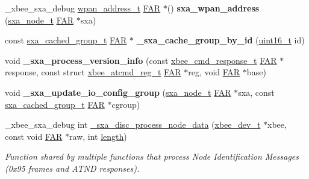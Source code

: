 \begin{DoxyCompactItemize}
\+\_\+xbee\+\_\+sxa\+\_\+debug \hyperlink{structwpan__address__t}{wpan\+\_\+address\+\_\+t} \hyperlink{group__hal_gaef060b3456fdcc093a7210a762d5f2ed}{F\+AR} $\ast$() {\bfseries sxa\+\_\+wpan\+\_\+address} (\hyperlink{structsxa__node__t}{sxa\+\_\+node\+\_\+t} \hyperlink{group__hal_gaef060b3456fdcc093a7210a762d5f2ed}{F\+AR} $\ast$sxa)
\item 
\mbox{\label{group___s_x_a_gaf299bcddfe8f4dfb4a3f0617a16d671e}} 
const \hyperlink{structsxa__cached__group__t}{sxa\+\_\+cached\+\_\+group\+\_\+t} \hyperlink{group__hal_gaef060b3456fdcc093a7210a762d5f2ed}{F\+AR} $\ast$ {\bfseries \+\_\+sxa\+\_\+cache\+\_\+group\+\_\+by\+\_\+id} (\hyperlink{group__hal__dos_ga5a8b2dc9e45a9ee81a94ef304fb62505}{uint16\+\_\+t} id)
\item 
\mbox{\label{group___s_x_a_gaac6448275c5e6b10263ae7c73afce3c3}} 
void {\bfseries \+\_\+sxa\+\_\+process\+\_\+version\+\_\+info} (const \hyperlink{structxbee__cmd__response__t}{xbee\+\_\+cmd\+\_\+response\+\_\+t} \hyperlink{group__hal_gaef060b3456fdcc093a7210a762d5f2ed}{F\+AR} $\ast$response, const struct \hyperlink{structxbee__atcmd__reg__t}{xbee\+\_\+atcmd\+\_\+reg\+\_\+t} \hyperlink{group__hal_gaef060b3456fdcc093a7210a762d5f2ed}{F\+AR} $\ast$reg, void \hyperlink{group__hal_gaef060b3456fdcc093a7210a762d5f2ed}{F\+AR} $\ast$base)
\item 
\mbox{\label{group___s_x_a_ga52a1b2b68e747e9f286974c473cb8a9b}} 
void {\bfseries \+\_\+sxa\+\_\+update\+\_\+io\+\_\+config\+\_\+group} (\hyperlink{structsxa__node__t}{sxa\+\_\+node\+\_\+t} \hyperlink{group__hal_gaef060b3456fdcc093a7210a762d5f2ed}{F\+AR} $\ast$sxa, const \hyperlink{structsxa__cached__group__t}{sxa\+\_\+cached\+\_\+group\+\_\+t} \hyperlink{group__hal_gaef060b3456fdcc093a7210a762d5f2ed}{F\+AR} $\ast$cgroup)
\item 
\+\_\+xbee\+\_\+sxa\+\_\+debug int \hyperlink{group___s_x_a_ga9ae9421a9cd885d2299aabb74251cb48}{\+\_\+sxa\+\_\+disc\+\_\+process\+\_\+node\+\_\+data} (\hyperlink{structxbee__dev__t}{xbee\+\_\+dev\+\_\+t} $\ast$xbee, const void \hyperlink{group__hal_gaef060b3456fdcc093a7210a762d5f2ed}{F\+AR} $\ast$raw, int \hyperlink{group__zdo_gab2b3adeb2a67e656ff030b56727fd0ac}{length})
\begin{DoxyCompactList}\small\item\em Function shared by multiple functions that process Node Identification Messages (0x95 frames and A\+T\+ND responses). \end{DoxyCompactList}\item 

\end{DoxyCompactItemize}
